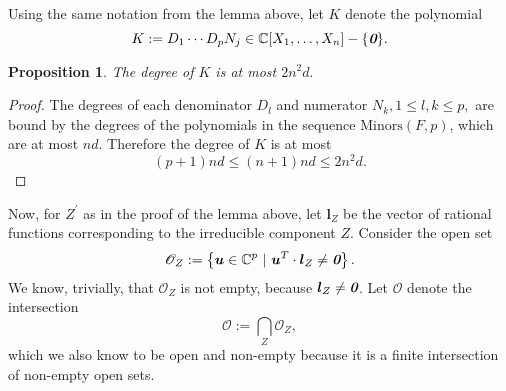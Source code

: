 \documentclass[a4paper]{article}
\def\sO{\mathscr{O}}
\def\bz{\textit{\textbf{0}}}
\def\ub{{\bm u}}
\def\lb{{\bm l}}
\def\minors{\textrm{Minors}(F,p)}
\def\C{\mathbb{C}}
\newtheorem{prop}[theorem]{Proposition}
\begin{document}
\noindent
Using the same notation from the lemma above, let $K$ denote the polynomial 
\begin{equation}\label{eq:K}
K := D_1 \cdots D_p N_j \in \C[X_1,\hdots,X_n] - \{\bz\}.
\end{equation}
%
\begin{prop}\label{prop:Kdegree}
The degree of $K$ is at most $2n^2d.$
\end{prop}
\begin{proof}
The degrees of each denominator $D_l$ and numerator $N_k,  1 \leq l,k \leq p,$ are bound by the degrees of the polynomials in the sequence $\minors$, which are at most $nd.$ Therefore the degree of $K$ is at most \[(p+1)nd \leq (n+1)nd \leq 2n^2d.\] 
\end{proof}
%
\noindent 
Now, for $Z^{'}$ as in the proof of the lemma above, let $\lb_Z$ be the vector of rational functions corresponding to the irreducible component $Z$. Consider the open set
\[
\mathscr{O}_{Z} := 
\left\{\ub \in \C^p~|~\ub^T\cdot \lb_{Z} \not = \textit{\textbf{0}}\right\}.
\]
We know, trivially, that $\mathscr{O}_Z$ is not empty, because $\lb_{Z} \not = \bz$.  Let $\sO$ denote the intersection
\[
\mathscr{O} := 
\bigcap_Z \mathscr{O}_{Z},
\]
which we also know to be open and non-empty because it is a finite intersection of non-empty open sets.
\end{document}
